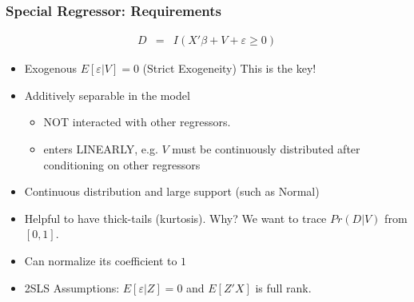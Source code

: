 \documentclass[11pt,dvipsnames,table,aspectratio=169]{beamer}
\begin{document}
\begin{frame}
\frametitle{Special Regressor: Requirements}
\begin{eqnarray*}
D &=& I ( X' \beta + V + \varepsilon \geq 0 )
\end{eqnarray*}
\vspace{-8pt}
\begin{itemize}
\item Exogenous $E[\varepsilon | V ] =0$ (Strict Exogeneity) \alert{This is the key!} 
\item Additively separable in the model
\begin{itemize}
       \item NOT interacted with other regressors.
       \item enters LINEARLY, e.g. $V$ must be continuously distributed after conditioning on other regressors 
\end{itemize}
\item Continuous distribution and large support (such as Normal)

\item Helpful to have thick-tails (kurtosis). Why? We want to trace $Pr(D | V)$ from $[0,1]$.
\item Can normalize its coefficient to $1$
\item 2SLS Assumptions: $E[ \varepsilon | Z] = 0$ and $E[Z'X]$ is full rank.
\end{itemize}
\end{frame}

\end{document}
